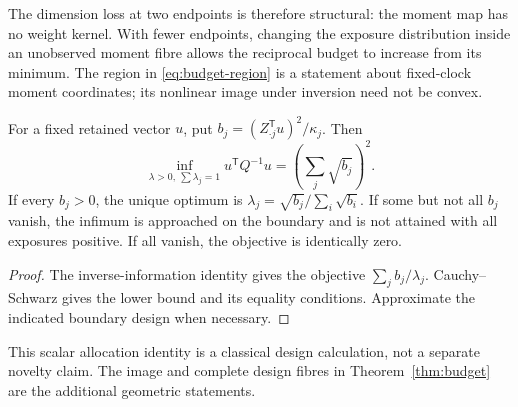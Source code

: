 The dimension loss at two endpoints is therefore structural: the moment map has no weight kernel. With fewer endpoints, changing the exposure distribution inside an unobserved moment fibre allows the reciprocal budget to increase from its minimum. The region in \eqref{eq:budget-region} is a statement about fixed-clock moment coordinates; its nonlinear image under inversion need not be convex.

\begin{corollary}\label{cor:scalar-budget}
For a fixed retained vector $u$, put $b_j=(Z_{\cdot j}^{\mathsf T}u)^2/\kappa_j$. Then
\[
 \inf_{\lambda>0,\ \sum\lambda_j=1}u^{\mathsf T}Q^{-1}u
 =\left(\sum_j\sqrt{b_j}\right)^2.
\]
If every $b_j>0$, the unique optimum is $\lambda_j=\sqrt{b_j}/\sum_i\sqrt{b_i}$. If some but not all $b_j$ vanish, the infimum is approached on the boundary and is not attained with all exposures positive. If all vanish, the objective is identically zero.
\end{corollary}
\begin{proof}
The inverse-information identity gives the objective $\sum_j b_j/\lambda_j$. Cauchy--Schwarz gives the lower bound and its equality conditions. Approximate the indicated boundary design when necessary.
\end{proof}
This scalar allocation identity is a classical design calculation, not a separate novelty claim. The image and complete design fibres in Theorem~\ref{thm:budget} are the additional geometric statements.

